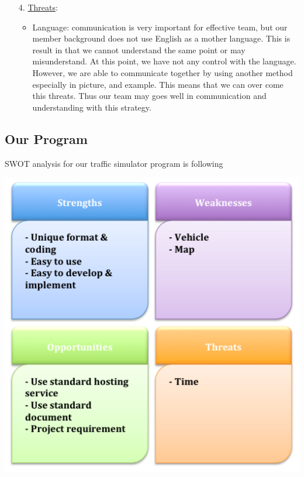 \documentclass[11pt]{article}
\begin{document}
\begin{itemize}
		\item[4. ] \underline{Threats}:
		\begin{itemize}
			\item{} Language: communication is very important for effective team, but our member background does not use English as a mother language. This is result in that we cannot understand the same point or may misunderstand. At this point, we have not any control with the language. However, we are able to communicate together by using another method especially in picture, and example. This means that we can over come this threats. Thus our team may goes well in communication and understanding with this strategy.
  		\end{itemize}					
	\end{itemize}
	\newpage
		\subsection{Our Program}
	\indent\indent SWOT analysis for our traffic simulator program is following
	\begin{center}			
			\includegraphics[scale = 0.4]{Figure03}
	\end{center}
\end{document}
